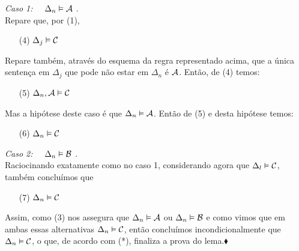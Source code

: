    \begin{ebullet}
	   \item[\emph{Caso 1: \ \ $\Delta_n \vDash \mathcal{A}$}].
	   		\\Repare que, por (1),
	   		\begin{itemize}
	   			\item[(4)] $\Delta_j \vDash \mathcal{C}$
	   		\end{itemize}
	   		Repare também, através do esquema da regra representado acima, que a única sentença em $\Delta_{j}$ que pode não estar em $\Delta_{n}$ é $\mathcal{A}$. Então, de (4) temos:
	   		\begin{itemize}
				\item[(5)] $\Delta_n, \mathcal{A} \vDash \mathcal{C}$
			\end{itemize} 
			Mas a hipótese deste caso é que $\Delta_n \vDash \mathcal{A}$. Então de (5) e desta hipótese temos:
			\begin{itemize}
				\item[(6)] $\Delta_n \vDash \mathcal{C}$
			\end{itemize}
	   \item[\emph{Caso 2: \ \ $\Delta_n \vDash \mathcal{B}$}].
	   		\\Raciocinando exatamente como no caso 1, considerando agora que $\Delta_l \vDash \mathcal{C}$, também concluímos que
		   \begin{itemize}
	   			\item[(7)] $\Delta_n \vDash \mathcal{C}$
	   		\end{itemize}
	\end{ebullet}
Assim, como (3) nos assegura que $\Delta_n \vDash \mathcal{A}$ ou $\Delta_n \vDash \mathcal{B}$ e como vimos que em ambas essas alternativas $\Delta_n \vDash \mathcal{C}$, então concluímos incondicionalmente que $\Delta_n \vDash \mathcal{C}$, o que, de acordo com (*), finaliza a prova do lema.$\blacklozenge$

